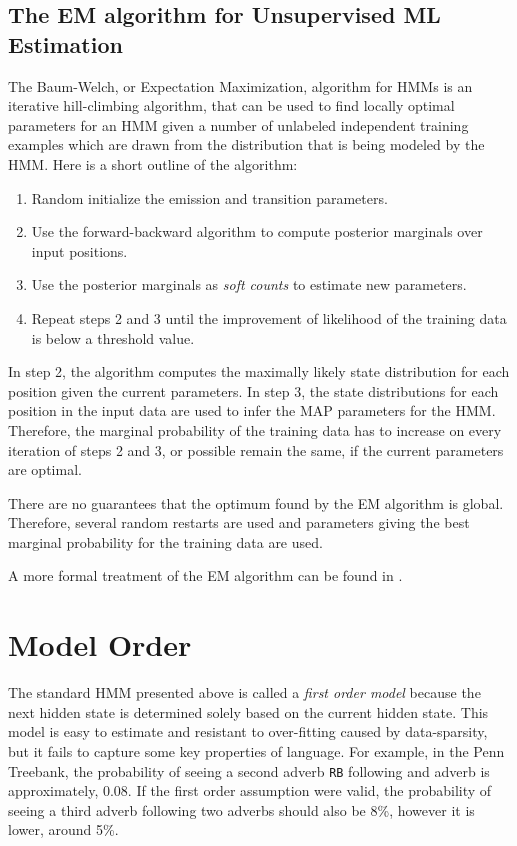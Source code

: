 \subsection{The EM algorithm for Unsupervised ML Estimation}

The Baum-Welch, or Expectation Maximization, algorithm for HMMs is an
iterative hill-climbing algorithm, that can be used to find locally
optimal parameters for an HMM given a number of unlabeled independent
training examples which are drawn from the distribution that is being
modeled by the HMM. Here is a short outline of the algorithm:
\begin{enumerate}
\item Random initialize the emission and transition parameters.
\item Use the forward-backward algorithm to compute posterior
  marginals over input positions.
\item Use the posterior marginals as {\it soft counts} to estimate new
  parameters.
\item Repeat steps 2 and 3 until the improvement of likelihood of the
  training data is below a threshold value.
\end{enumerate}

In step 2, the algorithm computes the maximally likely state
distribution for each position given the current parameters. In step
3, the state distributions for each position in the input data are
used to infer the MAP parameters for the HMM. Therefore, the marginal
probability of the training data has to increase on every iteration of
steps 2 and 3, or possible remain the same, if the current parameters
are optimal.

There are no guarantees that the optimum found by the EM algorithm is
global. Therefore, several random restarts are used and parameters
giving the best marginal probability for the training data are used. 

A more formal treatment of the EM algorithm can be found in \cite{Blimes1997}.

\section{Model Order}

The standard HMM presented above is called a {\it first order model}
because the next hidden state is determined solely based on the
current hidden state. This model is easy to estimate and resistant to
over-fitting caused by data-sparsity, but it fails to capture some key
properties of language. For example, in the Penn Treebank, the
probability of seeing a second adverb {\tt RB} following and adverb
is approximately, 0.08. If the first order assumption were valid, the
probability of seeing a third adverb following two adverbs should also
be 8\%, however it is lower, around 5\%.

